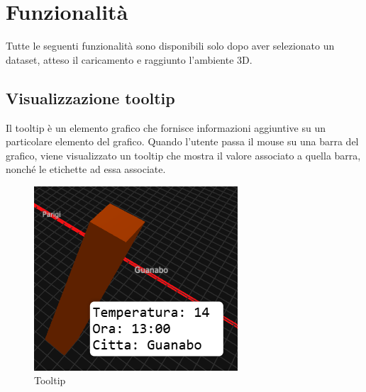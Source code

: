 \section{Funzionalità}
Tutte le seguenti funzionalità sono disponibili solo dopo aver selezionato un
dataset, atteso il caricamento e raggiunto l'ambiente 3D.

\subsection{Visualizzazione tooltip}
Il tooltip è un elemento grafico che fornisce informazioni aggiuntive su un
particolare elemento del grafico. Quando l'utente passa il mouse su una barra
del grafico, viene visualizzato un tooltip che mostra il valore associato a
quella barra, nonché le etichette ad essa associate.
\begin{figure}[ht!]
    \centering
    \includegraphics[scale=0.6]{template/images/tooltip.png}
    \caption{Tooltip}
\end{figure}

